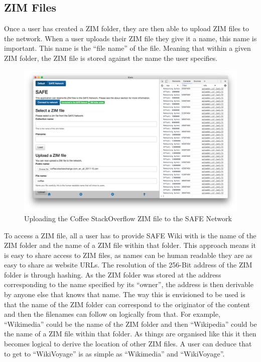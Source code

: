 \subsection{ZIM Files}

Once a user has created a ZIM folder, they are then able to upload ZIM files to the network. When a user uploads their ZIM file they give it a name, this name is important. This name is the ``file name'' of the file. Meaning that within a given ZIM folder, the ZIM file is stored against the name the user specifies.

\begin{figure}[h]
	\begin{center}
		\includegraphics[width=\textwidth]{images/safe-wiki-uploading-coffee}
		\caption{Uploading the Coffee StackOverflow ZIM file to the SAFE Network}
		\label{fig:safe-upload-coffee}
	\end{center}
\end{figure}

To access a ZIM file, all a user has to provide SAFE Wiki with is the name of the ZIM folder and the name of a ZIM file within that folder. This approach means it is easy to share access to ZIM files, as names can be human readable they are as easy to share as website URLs. The resolution of the 256-Bit address of the ZIM folder is through hashing. As the ZIM folder was stored at the address corresponding to the name specified by its ``owner'', the address is then derivable by anyone else that knows that name. The way this is envisioned to be used is that the name of the ZIM folder can correspond to the originator of the content and then the filenames can follow on logically from that. For example, ``Wikimedia'' could be the name of the ZIM folder and then ``Wikipedia'' could be the name of a ZIM file within that folder. As things are organised like this it then becomes logical to derive the location of other ZIM files. A user can deduce that to get to ``WikiVoyage'' is as simple as ``Wikimedia'' and ``WikiVoyage''.

